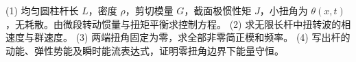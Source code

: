 (1) 均匀圆柱杆长 \(L\)，密度 \(\rho\)，剪切模量 \(G\)，截面极惯性矩 \(J\)，小扭角为 \(\theta(x,t)\)，无耗散。由微段转动惯量与扭矩平衡求控制方程。
(2) 求无限长杆中扭转波的相速度与群速度。
(3) 两端扭角固定为零，求全部非零简正模和频率。
(4) 写出杆的动能、弹性势能及瞬时能流表达式，证明零扭角边界下能量守恒。
